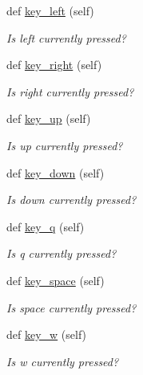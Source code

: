 \begin{DoxyCompactItemize}
def \hyperlink{classbridges_1_1non__blocking__game_1_1_non_blocking_game_a87490ef28d161f22e753aab5d3e67e46}{key\+\_\+left} (self)
\begin{DoxyCompactList}\small\item\em Is left currently pressed? \end{DoxyCompactList}\item 
def \hyperlink{classbridges_1_1non__blocking__game_1_1_non_blocking_game_a31b6f78c39a93f0ba5350d346043bde9}{key\+\_\+right} (self)
\begin{DoxyCompactList}\small\item\em Is right currently pressed? \end{DoxyCompactList}\item 
def \hyperlink{classbridges_1_1non__blocking__game_1_1_non_blocking_game_a7e853081cefe51511de0c6438aeea871}{key\+\_\+up} (self)
\begin{DoxyCompactList}\small\item\em Is up currently pressed? \end{DoxyCompactList}\item 
def \hyperlink{classbridges_1_1non__blocking__game_1_1_non_blocking_game_af9a280c2d221140eddba0e4bcb0afb9b}{key\+\_\+down} (self)
\begin{DoxyCompactList}\small\item\em Is down currently pressed? \end{DoxyCompactList}\item 
def \hyperlink{classbridges_1_1non__blocking__game_1_1_non_blocking_game_a75e94a930466b607828b6ef092f810d6}{key\+\_\+q} (self)
\begin{DoxyCompactList}\small\item\em Is q currently pressed? \end{DoxyCompactList}\item 
def \hyperlink{classbridges_1_1non__blocking__game_1_1_non_blocking_game_a1059ffd8d5daa3a0db2e6847f5724883}{key\+\_\+space} (self)
\begin{DoxyCompactList}\small\item\em Is space currently pressed? \end{DoxyCompactList}\item 
def \hyperlink{classbridges_1_1non__blocking__game_1_1_non_blocking_game_abeb435c75a3022c50f472ee2a4207809}{key\+\_\+w} (self)
\begin{DoxyCompactList}\small\item\em Is w currently pressed? \end{DoxyCompactList}\item 

\end{DoxyCompactItemize}
